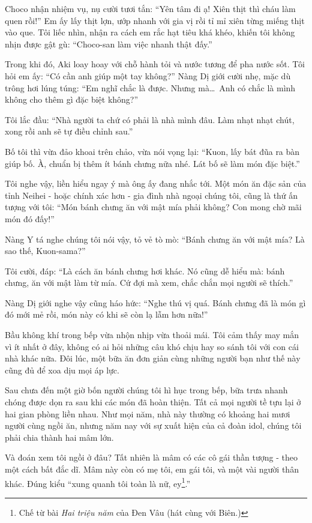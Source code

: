\documentclass[../main.tex]{subfiles}
\begin{document}
Choco nhận nhiệm vụ, nụ cười tươi tắn: ``Yên tâm đi ạ! Xiên thịt thì cháu làm quen rồi!'' Em ấy lấy thịt lợn, ướp nhanh với gia vị rồi tỉ mỉ xiên từng miếng thịt vào que. Tôi liếc nhìn, nhận ra cách em rắc hạt tiêu khá khéo, khiến tôi không nhịn được gật gù: ``Choco-san làm việc nhanh thật đấy.''

Trong khi đó, Aki loay hoay với chỗ hành tỏi và nước tương để pha nước sốt. Tôi hỏi em ấy: ``Có cần anh giúp một tay không?'' Nàng Dị giới cười nhẹ, mặc dù trông hơi lúng túng: ``Em nghĩ chắc là được. Nhưng mà\dots\ Anh có chắc là mình không cho thêm gì đặc biệt không?''

Tôi lắc đầu: ``Nhà người ta chứ có phải là nhà mình đâu. Làm nhạt nhạt chút, xong rồi anh sẽ tự điều chỉnh sau.''

Bố tôi thì vừa đảo khoai trên chảo, vừa nói vọng lại: ``Kuon, lấy bát đũa ra bàn giúp bố. À, chuẩn bị thêm ít bánh chưng nữa nhé. Lát bố sẽ làm món đặc biệt.''

Tôi nghe vậy, liền hiểu ngay ý mà ông ấy đang nhắc tới. Một món ăn đặc sản của tỉnh Neihei - hoặc chính xác hơn - gia đình nhà ngoại chúng tôi, cũng là thứ ấn tượng với tôi: ``Món bánh chưng ăn với mật mía phải không? Con mong chờ mãi món đó đấy!''

Nàng Y tá nghe chúng tôi nói vậy, tỏ vẻ tò mò: ``Bánh chưng ăn với mật mía? Là sao thế, Kuon-sama?''

Tôi cười, đáp: ``Là cách ăn bánh chưng hơi khác. Nó cũng dễ hiểu mà: bánh chưng, ăn với mật làm từ mía. Cứ đợi mà xem, chắc chắn mọi người sẽ thích.''

Nàng Dị giới nghe vậy cũng háo hức: ``Nghe thú vị quá. Bánh chưng đã là món gì đó mới mẻ rồi, món này có khi sẽ còn lạ lẫm hơn nữa!''

Bầu không khí trong bếp vừa nhộn nhịp vừa thoải mái. Tôi cảm thấy may mắn vì ít nhất ở đây, không có ai hỏi những câu khó chịu hay so sánh tôi với con cái nhà khác nữa. Đôi lúc, một bữa ăn đơn giản cùng những người bạn như thế này cũng đủ để xoa dịu mọi áp lực.

\ct

Sau chưa đến một giờ bốn người chúng tôi hì hục trong bếp, bữa trưa nhanh chóng được dọn ra sau khi các món đã hoàn thiện. Tất cả mọi người tề tựu lại ở hai gian phòng liền nhau. Như mọi năm, nhà này thường có khoảng hai mươi người cùng ngồi ăn, nhưng năm nay với sự xuất hiện của cả đoàn idol, chúng tôi phải chia thành hai mâm lớn.

Và đoán xem tôi ngồi ở đâu? Tất nhiên là mâm có các cô gái thần tượng - theo một cách bất đắc dĩ. Mâm này còn có mẹ tôi, em gái tôi, và một vài người thân khác. Đúng kiểu ``xung quanh tôi toàn là nữ, ey\footnote{Chế từ bài \textit{Hai triệu năm} của Đen Vâu (hát cùng với Biên.)}.''
\end{document}

